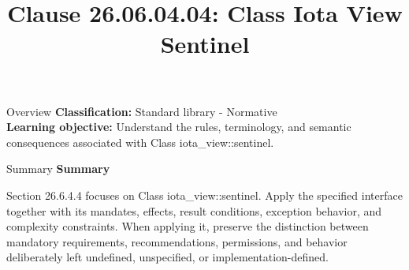 \documentclass[10pt,letterpaper]{article}
\title{Clause 26.06.04.04: Class Iota View Sentinel}
\author{}
\date{}
\begin{document}
\maketitle
\begin{CornellOverviewBox}{Overview}
\textbf{Classification:} Standard library - Normative\\[2pt]
\textbf{Learning objective:} Understand the rules, terminology, and semantic consequences associated with Class iota\_view::sentinel.
\end{CornellOverviewBox}\begin{CornellSummaryBox}{Summary}
{\sffamily\bfseries\color{Accent} Summary}\par\vspace{3pt}Section 26.6.4.4 focuses on Class iota\_view::sentinel. Apply the specified interface together with its mandates, effects, result conditions, exception behavior, and complexity constraints. When applying it, preserve the distinction between mandatory requirements, recommendations, permissions, and behavior deliberately left undefined, unspecified, or implementation-defined.
\end{CornellSummaryBox}
\end{document}
